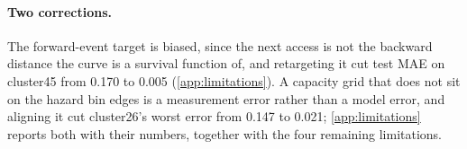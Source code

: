\paragraph{Two corrections.}
The forward-event target is biased, since the next access is not the backward distance
the curve is a survival function of, and retargeting it cut test MAE on cluster45 from
0.170 to 0.005 (\cref{app:limitations}). A capacity grid that does not sit on the
hazard bin edges is a measurement error rather than a model error, and aligning it cut
cluster26's worst error from 0.147 to 0.021; \cref{app:limitations} reports both with
their numbers, together with the four remaining limitations.
